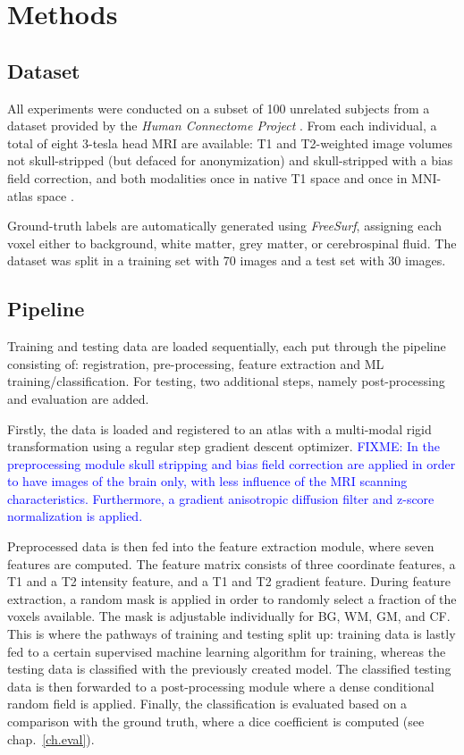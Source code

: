 \documentclass[journal]{IEEEtran}
\newcommand\FIXME[1]{\textcolor{blue}{FIXME: #1}}
\begin{document}
\section{Methods}

\subsection{Dataset}
All experiments were conducted on a subset of 100 unrelated subjects from a dataset provided by the \textit{Human Connectome Project} \cite{van2013wu}. From each individual, a total of eight 3-tesla head MRI are available: T1 and T2-weighted image volumes not skull-stripped (but defaced for anonymization) and skull-stripped with a bias field correction, and both modalities once in native T1 space and once in MNI-atlas space \cite{mazziotta2001probabilistic}.

Ground-truth labels are automatically generated using \textit{FreeSurf}, assigning each voxel either to background, white matter, grey matter, or cerebrospinal fluid. The dataset was split in a training set with 70 images and a test set with 30 images.

\subsection{Pipeline}

Training and testing data are loaded sequentially, each put through the pipeline consisting of: registration, pre-processing, feature extraction and ML training/classification. For testing, two additional steps, namely post-processing and evaluation are added.

Firstly, the data is loaded and registered to an atlas with a multi-modal rigid transformation using a regular step gradient descent optimizer. \FIXME{In the preprocessing module skull stripping and bias field correction are applied in order to have images of the brain only, with less influence of the MRI scanning characteristics. Furthermore, a gradient anisotropic diffusion filter and z-score normalization is applied.}

Preprocessed data is then fed into the feature extraction module, where seven features are computed. The feature matrix consists of three coordinate features, a T1 and a T2 intensity feature, and a T1 and T2 gradient feature. During feature extraction, a random mask is applied in order to randomly select a fraction of the voxels available. The mask is adjustable individually for BG, WM, GM, and CF. This is where the pathways of training and testing split up: training data is lastly fed to a certain supervised machine learning algorithm for training, whereas the testing data is classified with the previously created model. The classified testing data is then forwarded to a post-processing module where a dense conditional random field \cite{krahenbuhl2011efficient} is applied.
Finally, the classification is evaluated based on a comparison with the ground truth, where a dice coefficient is computed (see chap.~\ref{ch.eval}).
\end{document}
